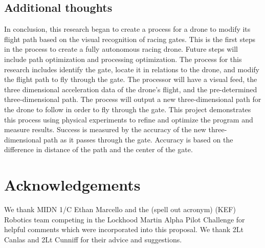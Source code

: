 \documentclass[onecolumn,10pt]{IEEEtran}
\begin{document}
\subsection{Additional thoughts}
In conclusion, this research began to create a process for a drone to modify its flight path based on the visual recognition of racing gates. This is the first steps in the process to create a fully autonomous racing drone. Future steps will include path optimization and processing optimization. The process for this research includes identify the gate, locate it in relations to the drone, and modify the flight path to fly through the gate. The processor will have a visual feed, the three dimensional acceleration data of the drone’s flight, and the pre-determined three-dimensional path. The process will output a new three-dimensional path for the drone to follow in order to fly through the gate. This project demonstrates this process using physical experiments to refine and optimize the program and measure results. Success is measured by the accuracy of the new three-dimensional path as it passes through the gate. Accuracy is based on the difference in distance of the path and the center of the gate. 





\section*{Acknowledgements}
We thank MIDN 1/C Ethan Marcello and the (spell out acronym) (KEF) Robotics team competing in the Lockhood Martin Alpha Pilot Challenge for helpful comments which were incorporated into this proposal. We thank 2Lt Canlas and 2Lt Cunniff for their advice and suggestions.
\end{document}
